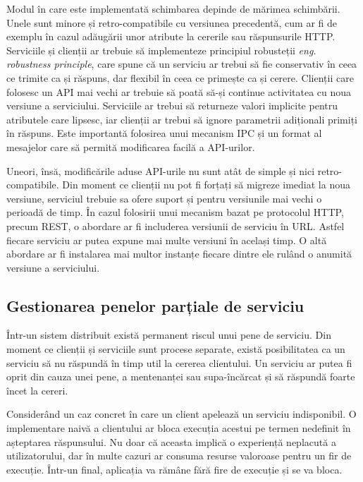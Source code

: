 \documentclass[12pt, a4paper, oneside, romanian]{teza-upb}
\begin{document}
Modul în care este implementată schimbarea depinde de mărimea schimbării. Unele sunt minore și retro-compatibile cu versiunea precedentă, cum ar fi de exemplu în cazul adăugării unor atribute la cererile sau răspunsurile HTTP. Serviciile și clienții ar trebuie să implementeze principiul robusteții \textit{eng. robustness principle}, care spune că un serviciu ar trebui să fie conservativ în ceea ce trimite ca și răspuns, dar flexibil în ceea ce primește ca și cerere. Clienții care folosesc un API mai vechi ar trebuie să poată să-și continue activitatea cu noua versiune a serviciului. Serviciile ar trebui să returneze valori implicite pentru atributele care lipsesc, iar clienții ar trebui să ignore parametrii adiționali primiți în răspuns. Este importantă folosirea unui mecanism IPC și un format al mesajelor care să permită modificarea facilă a API-urilor. 

Uneori, însă, modificările aduse API-urile nu sunt atât de simple și nici retro-compatibile. Din moment ce clienții nu pot fi forțați să migreze imediat la noua versiune, serviciul trebuie sa ofere suport și pentru versiunile mai vechi o perioadă de timp. În cazul folosirii unui mecanism bazat pe protocolul HTTP, precum REST, o abordare ar fi includerea versiunii de serviciu în URL. Astfel fiecare serviciu ar putea expune mai multe versiuni în același timp. O altă abordare ar fi instalarea mai multor instanțe fiecare dintre ele rulând o anumită versiune a serviciului. 

\subsection{Gestionarea penelor parțiale de serviciu}

Într-un sistem distribuit există permanent riscul unui pene de serviciu. Din moment ce clienții și serviciile sunt procese separate, există posibilitatea ca un serviciu să nu răspundă în timp util la cererea clientului. Un serviciu ar putea fi oprit din cauza unei pene, a mentenanței sau supa-încărcat și să răspundă foarte încet la cereri. 

Considerând un caz concret în care un client apelează un serviciu indisponibil. O implementare naivă a clientului ar bloca execuția acestui pe termen nedefinit în așteptarea răspunsului. Nu doar că aceasta implică o experiență neplacută a utilizatorului, dar în multe cazuri ar consuma resurse valoroase pentru un fir de execuție. Într-un final, aplicația va rămâne fără fire de execuție și se va bloca. 
\end{document}
